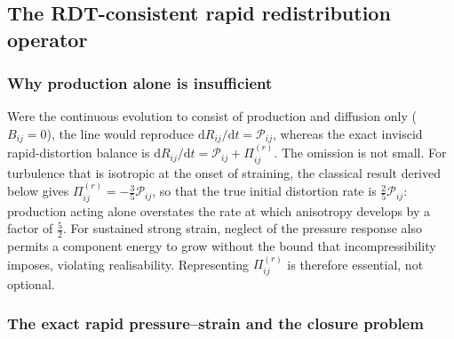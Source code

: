 \documentclass[lineno]{JFM-FLM_Au}
\begin{document}
\subsection{The RDT-consistent rapid redistribution
operator}\label{sec:rapid-kernel}

\subsubsection{Why production alone is insufficient}

Were the continuous evolution to consist of production and diffusion only
($B_{ij}=0$), the line would reproduce $\mathrm{d}R_{ij}/\mathrm{d}t=
\mathcal{P}_{ij}$, whereas the exact inviscid rapid-distortion balance is
$\mathrm{d}R_{ij}/\mathrm{d}t=\mathcal{P}_{ij}+\Pi_{ij}^{(r)}$. The
omission is not small. For turbulence that is isotropic at the onset of
straining, the classical result derived below gives
$\Pi_{ij}^{(r)}=-\tfrac35\mathcal{P}_{ij}$, so that the true initial
distortion rate is $\tfrac25\mathcal{P}_{ij}$: production acting alone
overstates the rate at which anisotropy develops by a factor of
$\tfrac52$. For sustained strong strain, neglect of the pressure response
also permits a component energy to grow without the bound that
incompressibility imposes, violating realisability. Representing
$\Pi_{ij}^{(r)}$ is therefore essential, not optional.

\subsubsection{The exact rapid pressure--strain and the closure problem}
\end{document}
